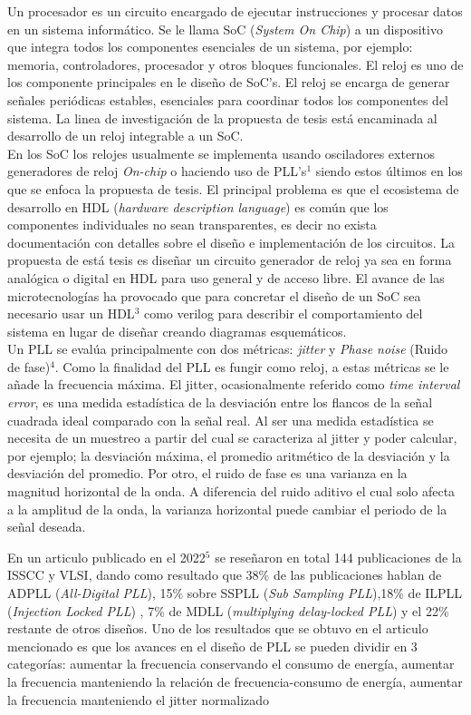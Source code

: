 \documentclass[runningheads,a4paper]{llncs}
\begin{document}
Un procesador es un circuito encargado de ejecutar instrucciones y procesar datos en un sistema informático. Se le llama SoC (\textit{System On Chip}) a un dispositivo que integra todos los componentes esenciales de un sistema, por ejemplo: memoria, controladores, procesador y otros bloques funcionales. El reloj es uno de los componente principales en le diseño de SoC's. El reloj se encarga de generar señales periódicas estables, esenciales para coordinar todos los componentes del sistema. La linea de investigación de la propuesta de tesis está encaminada al desarrollo de un reloj integrable a un SoC.\\



    En los SoC los relojes usualmente se implementa usando osciladores externos generadores de reloj \textit{On-chip} o haciendo uso de PLL's${}^1$ siendo estos últimos en los que se enfoca la propuesta de tesis. El principal problema es que el ecosistema de desarrollo en HDL (\textit{hardware description language}) es común que los componentes individuales no sean transparentes, es decir no exista documentación con detalles sobre el diseño e implementación de los circuitos. La propuesta de está tesis es diseñar un circuito generador de reloj ya sea en forma analógica o digital en HDL para uso general y de acceso libre. El avance de las microtecnologías ha provocado que para concretar el diseño de un SoC sea necesario usar un HDL${}^3$ como verilog para describir el comportamiento del sistema en lugar de diseñar creando diagramas esquemáticos.\\

   Un PLL se evalúa principalmente con dos métricas: \textit{jitter} y \textit{Phase noise} (Ruido de fase)${}^4$. Como la finalidad del PLL es fungir como reloj, a estas métricas se le añade la frecuencia máxima. El jitter, ocasionalmente referido como \textit{time interval error}, es una medida estadística de la desviación entre los flancos de la señal cuadrada ideal comparado con la señal real. Al ser una medida estadística se necesita de un muestreo a partir del cual se caracteriza al jitter y poder calcular, por ejemplo; la desviación máxima, el promedio aritmético de la desviación y la desviación del promedio. Por otro, el ruido de fase es una varianza en la magnitud horizontal de la onda. A diferencia del ruido aditivo el cual solo afecta a la amplitud de la onda, la varianza horizontal puede cambiar el periodo de la señal deseada.

    En un articulo publicado en el 2022${}^5$ se reseñaron en total 144 publicaciones de la ISSCC y VLSI, dando como resultado que 38\% de las publicaciones hablan de ADPLL (\textit{All-Digital PLL}), 15\% sobre SSPLL (\textit{Sub Sampling PLL}),18\% de ILPLL (\textit{Injection Locked PLL}) , 7\% de MDLL (\textit{multiplying delay-locked PLL}) y el 22\% restante de otros diseños. Uno de los resultados que se obtuvo en el articulo mencionado es que los avances en el diseño de PLL se pueden dividir en 3 categorías: aumentar la frecuencia conservando el consumo de energía, aumentar la frecuencia manteniendo la relación de frecuencia-consumo de energía, aumentar la frecuencia manteniendo el jitter normalizado\\
\end{document}
